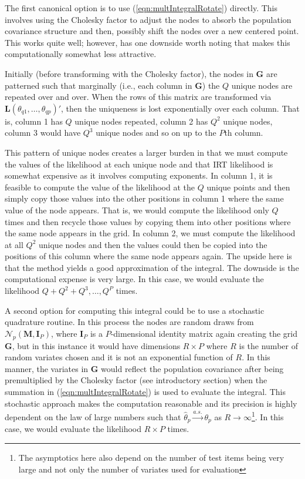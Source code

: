 \documentclass[12pt]{article}
\begin{document}
The first canonical option is to use (\ref{eqn:multIntegralRotate}) directly. This involves using the Cholesky factor to adjust the nodes to absorb the population covariance structure and then, possibly shift the nodes over a new centered point. This works quite well; however, has one downside worth noting that makes this computationally somewhat less attractive. 

Initially (before transforming with the Cholesky factor), the nodes in $\bm{G}$ are patterned such that marginally (i.e., each column in $\bm{G}$) the $Q$ unique nodes are repeated over and over. When the rows of this matrix are transformed via $\bm{L}(\theta_{q1}, \ldots, \theta_{qp})'$, then the uniqueness is lost exponentially over each column. That is, column 1 has $Q$ unique nodes repeated, column 2 has $Q^2$ unique nodes, column 3 would have $Q^3$ unique nodes and so on up to the $P$th column. 

This pattern of unique nodes creates a larger burden in that we must compute the values of the likelihood at each unique node and that IRT likelihood is somewhat expensive as it involves computing exponents. In column 1, it is feasible to compute the value of the likelihood at the $Q$ unique points and then simply copy those values into the other positions in column 1 where the same value of the node appears. That is, we would compute the likelihood only $Q$ times and then recycle those values by copying them into other positions where the same node appears in the grid. In column 2, we must compute the likelihood at all $Q^2$ unique nodes and then the values could then be copied into the positions of this column where the same node appears again. The upside here is that the method yields a good approximation of the integral. The downside is the computational expense is very large. In this case, we would evaluate the likelihood $Q + Q^2 + Q^3, \ldots, Q^P$ times.

A second option for computing this integral could be to use a stochastic quadrature routine. In this process the nodes are random draws from $\mathcal{N}_p(\bm{M}, \bm{I}_P)$, where $\bm{I}_P$ is a $P$-dimensional identity matrix again creating the grid $\bm{G}$, but in this instance it would have dimensions $R \times P$ where $R$ is the number of random variates chosen and it is not an exponential function of $R$. In this manner, the variates in $\bm{G}$ would reflect the population covariance after being premultiplied by the Cholesky factor (see introductory section) when the summation in (\ref{eqn:multIntegralRotate}) is used to evaluate the integral. This stochastic approach makes the computation reasonable and its precision is highly dependent on the law of large numbers such that $\widehat{\theta}_p\xrightarrow{a.s.}\theta_p$ as $R\rightarrow\infty$\footnote{The asymptotics here also depend on the number of test items being very large and not only the number of variates used for evaluation}. In this case, we would evaluate the likelihood $R \times P$ times.
\end{document}
